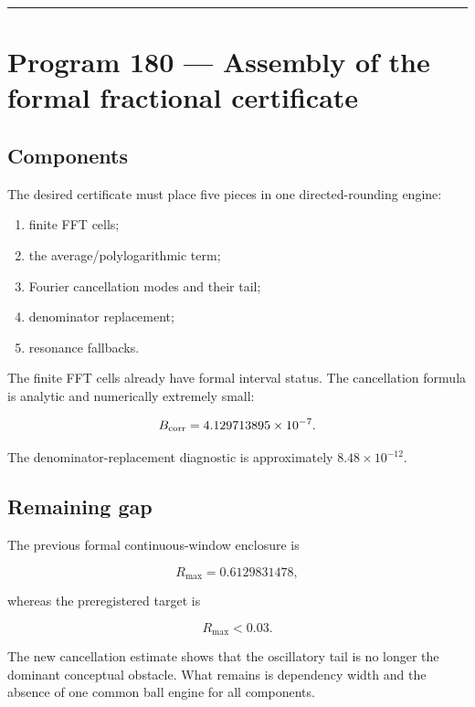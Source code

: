 \documentclass[11pt,a4paper,openany]{report}
\begin{document}
\par\medskip\hrule\medskip

\chapter{Program 180 --- Assembly of the formal fractional certificate}

\section{Components}

The desired certificate must place five pieces in one directed-rounding engine:

\begin{enumerate}
\item 
finite FFT cells;

\item 
the average/\allowbreak{}polylogarithmic term;

\item 
Fourier cancellation modes and their tail;

\item 
denominator replacement;

\item 
resonance fallbacks.

\end{enumerate}

The finite FFT cells already have formal interval status. The cancellation formula is analytic and numerically extremely small:

\[
B_{\rm corr}=4.129713895\times10^{-7}.
\]

The denominator-replacement diagnostic is approximately \(8.48\times10^{-12}\).

\section{Remaining gap}

The previous formal continuous-window enclosure is

\[
R_{\max}=0.6129831478,
\]

whereas the preregistered target is

\[
R_{\max}<0.03.
\]

The new cancellation estimate shows that the oscillatory tail is no longer the dominant conceptual obstacle. What remains is dependency width and the absence of one common ball engine for all components.
\end{document}
